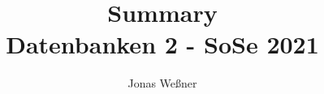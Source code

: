 \documentclass{article}
\begin{document}
\title{Summary\\Datenbanken 2 - SoSe 2021}
\author{Jonas Weßner}
\maketitle
\tableofcontents
\newpage				%






\end{document}
